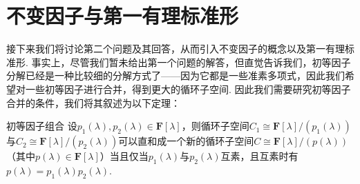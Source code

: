 \section{不变因子与第一有理标准形}
接下来我们将讨论第二个问题及其回答，从而引入不变因子的概念以及第一有理标准形. 事实上，尽管我们暂未给出第一个问题的解答，但直觉告诉我们，初等因子分解已经是一种比较细的分解方式了——因为它都是一些准素多项式，因此我们希望对一些初等因子进行合并，得到更大的循环子空间. 因此我们需要研究初等因子合并的条件，我们将其叙述为以下定理：
\begin{theorem}{}{初等因子组合}
    设$p_1(\lambda),p_2(\lambda)\in\mathbf{F}[\lambda]$，则循环子空间$C_1\cong\mathbf{F}[\lambda]/(p_1(\lambda))$与$C_2\cong\mathbf{F}[\lambda]/(p_2(\lambda))$可以直和成一个新的循环子空间$C\cong\mathbf{F}[\lambda]/(p(\lambda))$（其中$p(\lambda)\in\mathbf{F}[\lambda]$）当且仅当$p_1(\lambda)$与$p_2(\lambda)$互素，且互素时有$p(\lambda)=p_1(\lambda)p_2(\lambda)$.
\end{theorem}
